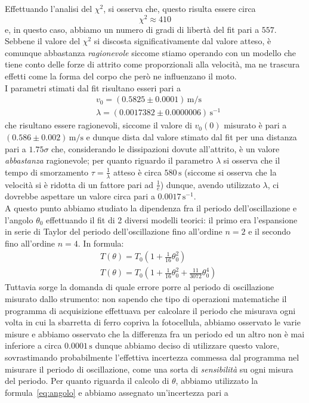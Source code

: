 \documentclass{article}
\begin{document}
\noindent Effettuando l'analisi del $\chi^2$, si osserva che, questo risulta essere circa
$$
	\chi^2 \approx 410
$$
e, in questo caso, abbiamo un numero di gradi di libertà del fit pari a $557$. Sebbene il valore del $\chi^2$ si discosta significativamente dal valore atteso, è comunque abbastanza \emph{ragionevole} siccome stiamo operando con un modello che tiene conto delle forze di attrito come proporzionali alla velocità, ma ne trascura effetti come la forma del corpo che però ne influenzano il moto. \\
I parametri stimati dal fit risultano esseri pari a
\begin{align}
	&v_0 = (0.5825 \pm 0.0001) \, \si{\meter\per\second} \\
	&\lambda = (0.0017382 \pm 0.0000006)\, \si{\second^{-1}}
\end{align}
che risultano essere ragionevoli, siccome il valore di $v_0(0)$ misurato è pari a $(0.586 \pm 0.002) \, \si{\meter\per\second}$ e dunque dista dal valore stimato dal fit per una distanza pari a $1.75\sigma$ che, considerando le dissipazioni dovute all'attrito, è un valore \emph{abbastanza} ragionevole; per quanto riguardo il parametro $\lambda$ si osserva che il tempo di smorzamento $\tau = \frac{1}{\lambda}$ atteso è circa $580 \, \si{\second}$ (siccome si osserva che la velocità si è ridotta di un fattore pari ad $\frac{1}{e}$) dunque, avendo utilizzato $\lambda$, ci dovrebbe aspettare un valore circa pari a $0.0017 \, \si{\second^{-1}}$. \\
A questo punto abbiamo studiato la dipendenza fra il periodo dell'oscillazione e l'angolo $\theta_0$ effettuando il fit di 2 diversi modelli teorici: il primo era l'espansione in serie di Taylor del periodo dell'oscillazione fino all'ordine $n=2$ e il secondo fino all'ordine $n=4$. In formula:
\begin{align}
	&T(\theta) = T_0 \left(1 + \frac{1}{16}\theta_0^2 \right) \\
	&T(\theta) = T_0 \left(1 + \frac{1}{16}\theta_0^2 + \frac{11}{3072}\theta_0^4 \right)
\end{align}
Tuttavia sorge la domanda di quale errore porre al periodo di oscillazione misurato dallo strumento: non sapendo che tipo di operazioni matematiche il programma di acquisizione effettuava per calcolare il periodo che misurava ogni volta in cui la sbarretta di ferro copriva la fotocellula, abbiamo osservato le varie misure e abbiamo osservato che la differenza fra un periodo ed un altro non è mai inferiore a circa $0.0001 \, \si{\second}$ dunque abbiamo deciso di utilizzare questo valore, sovrastimando probabilmente l'effettiva incertezza commessa dal programma nel misurare il periodo di oscillazione, come \clearpage \noindent una sorta di \emph{sensibilità} su ogni misura del periodo. Per quanto riguarda il calcolo di $\theta$, abbiamo utilizzato la  formula~\ref{eq:angolo} e abbiamo assegnato un'incertezza pari a
\end{document}
